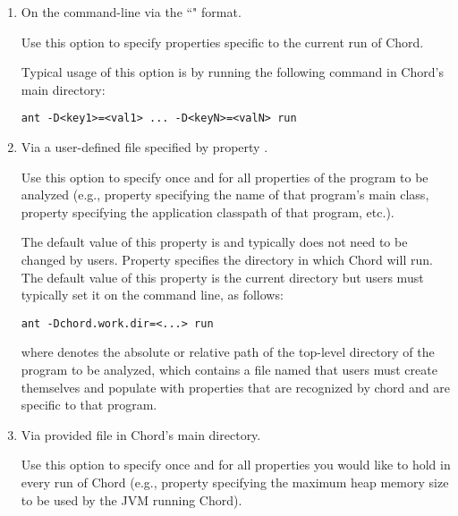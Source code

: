 \begin{enumerate}
\item

On the command-line via the ``" format.

Use this option to specify properties specific to the current run of Chord.

Typical usage of this option is by running the following command in Chord's main directory:

\begin{framed}
\begin{verbatim}
ant -D<key1>=<val1> ... -D<keyN>=<valN> run
\end{verbatim}
\end{framed}

\item

Via a user-defined file specified by property .

Use this option to specify once and for all properties of the program to
be analyzed (e.g., property  specifying the name of that program's main class, property 
specifying the application classpath of that program, etc.).

The default value of this property is  and typically
does not need to be changed by users.
Property  specifies the directory in which Chord will run.
The default value of this property is the current directory but users must typically set
it on the command line, as follows:

\begin{framed}
\begin{verbatim}
ant -Dchord.work.dir=<...> run
\end{verbatim}
\end{framed}

where  denotes the absolute or relative path of the top-level directory of
the program to be analyzed, which contains a file named  that users
must create themselves and populate with properties that are recognized by chord and
are specific to that program.

\item

Via provided file  in Chord's main directory.

Use this option to specify once and for all properties you would like to hold in every run of Chord
(e.g., property  specifying the maximum heap memory size to be used by the
JVM running Chord).
\end{enumerate}

